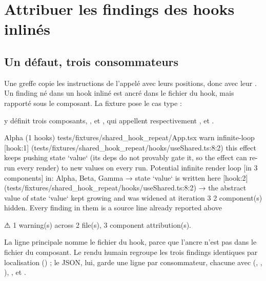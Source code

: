 \section{Attribuer les findings des hooks inlinés}
\label{sec:splice-attribution}

\subsection{Un défaut, trois consommateurs}

Une greffe copie les instructions de l'appelé avec leurs positions, donc avec leur . Un finding né dans un hook inliné est ancré dans le fichier du hook, mais rapporté sous le composant. La fixture  pose le cas type :


 y définit trois composants, ,  et , qui appellent respectivement ,  et .

\begin{sortie}
  Alpha  (1 hooks)  tests/fixtures/shared_hook_repeat/App.tsx
    warn   infinite-loop  [hook:1]  (tests/fixtures/shared_hook_repeat/hooks/useShared.ts:8:2)  this effect keeps pushing state `value` (its deps do not provably gate it, so the effect can re-run every render) to new values on every run. Potential infinite render loop  [in 3 components]
       in: Alpha, Beta, Gamma
       → state `value` is written here [hook:2] (tests/fixtures/shared_hook_repeat/hooks/useShared.ts:8:2)
       → the abstract value of state `value` kept growing and was widened at iteration 3
   2 component(s) hidden. Every finding in them is a source line already reported above

⚠  1 warning(s) across 2 file(s), 3 component attribution(s).
\end{sortie}

La ligne principale nomme le fichier du hook, parce que l'ancre n'est pas dans le fichier du composant. Le rendu humain regroupe les trois findings identiques par localisation () ; le JSON, lui, garde une ligne par consommateur, chacune avec  (, , ), ,  et .

